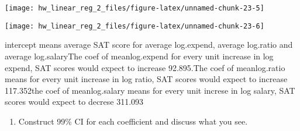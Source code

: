 \documentclass[]{article}
\newenvironment{Shaded}{\begin{snugshade}}{\end{snugshade}}
\newcommand{\DataTypeTok}[1]{\textcolor[rgb]{0.13,0.29,0.53}{#1}}
\newcommand{\DecValTok}[1]{\textcolor[rgb]{0.00,0.00,0.81}{#1}}
\newcommand{\KeywordTok}[1]{\textcolor[rgb]{0.13,0.29,0.53}{\textbf{#1}}}
\newcommand{\NormalTok}[1]{#1}
\newcommand{\OperatorTok}[1]{\textcolor[rgb]{0.81,0.36,0.00}{\textbf{#1}}}
\newcommand{\StringTok}[1]{\textcolor[rgb]{0.31,0.60,0.02}{#1}}
\providecommand{\tightlist}{%
  \setlength{\itemsep}{0pt}\setlength{\parskip}{0pt}}
\begin{document}
\begin{center}\texttt{[image: hw\_linear\_reg\_2\_files/figure-latex/unnamed-chunk-23-5]} \end{center}

\begin{center}\texttt{[image: hw\_linear\_reg\_2\_files/figure-latex/unnamed-chunk-23-6]} \end{center}

intercept means average SAT score for average log.expend, average
log.ratio and average log.salary\newline The coef of meanlog.expend for
every unit increase in log expend, SAT scores would expect to increase
92.895.\newline The coef of meanlog.ratio means for every unit increase
in log ratio, SAT scores would expect to increase 117.352\newline the
coef of meanlog.salary means for every unit increse in log salary, SAT
scores would expect to decrese 311.093\newline

\begin{enumerate}
\def\labelenumi{\arabic{enumi}.}
\setcounter{enumi}{1}
\tightlist
\item
  Construct 99\% CI for each coefficient and discuss what you see.
\end{enumerate}

\begin{Shaded}
\end{Shaded}
\end{document}
